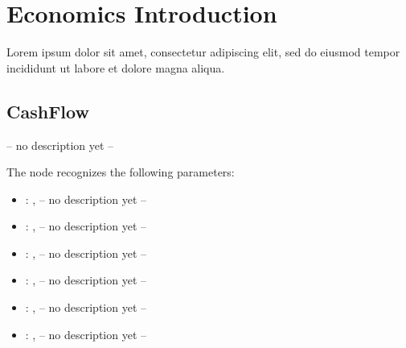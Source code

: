 \section{Economics Introduction}Lorem ipsum dolor sit amet, consectetur adipiscing elit, sed do eiusmod tempor incididunt ut labore et dolore magna aliqua.



\subsection{CashFlow}
  -- no description yet --

  The  node recognizes the following parameters:
    \begin{itemize}
      \item {}: , 
        -- no description yet --
      \item {}: , 
        -- no description yet --
      \item {}: , 
        -- no description yet --
      \item {}: , 
        -- no description yet --
      \item {}: , 
        -- no description yet --
      \item {}: , 
        -- no description yet --
  \end{itemize}

